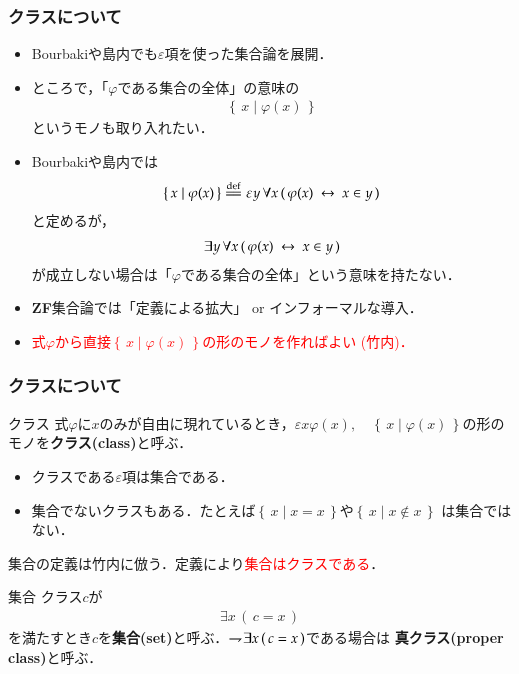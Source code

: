 \documentclass[dvipdfmx,10pt,notheorems]{beamer}
\theoremstyle{definition}
\newcommand{\Set}[2]{\left\{\, #1 \mid #2\, \right\}} %
\newcommand{\defeq}{\overset{\mathrm{def}}{=\joinrel=}} %
\newcommand{\negation}{\rightharpoondown\hspace{-0.25em}} %
\newcommand{\lrarrow}{\hspace{0.25em}\leftrightarrow\hspace{0.25em}} %
\begin{document}
\begin{frame}\frametitle{クラスについて}
	\begin{itemize}
		\item Bourbaki\cite{Bourbaki}や島内\cite{Shimauchi}でも$\varepsilon$項を使った集合論を展開．
		
		\item ところで，「$\varphi$である集合の全体」の意味の
			\begin{align}
				\Set{x}{\varphi(x)}
			\end{align}
			というモノも取り入れたい．
		
		\item Bourbaki\cite{Bourbaki}や島内\cite{Shimauchi}では
			\begin{align}
				\Set{x}{\varphi(x)} \defeq \varepsilon y\, \forall x\, 
				(\, \varphi(x) \lrarrow x \in y\, )
			\end{align}
			と定めるが，
			\begin{align}
				\exists y\, \forall x\, (\, \varphi(x) \lrarrow x \in y\, )
			\end{align}
			が成立しない場合は「$\varphi$である集合の全体」という意味を持たない．
		
		\item {\bf ZF}集合論では「定義による拡大」 or インフォーマルな導入．
			
		\item \textcolor{red}{式$\varphi$から直接$\Set{x}{\varphi(x)}$の形のモノを作ればよい
			(竹内\cite{TakeuchiSet})．}
	\end{itemize}
\end{frame}

\begin{frame}\frametitle{クラスについて}
	\begin{exampleblock}{クラス}
		式$\varphi$に$x$のみが自由に現れているとき，$\varepsilon x \varphi(x),
		\quad \Set{x}{\varphi(x)}$の形のモノを{\bf クラス(class)}と呼ぶ．
	\end{exampleblock}
	
	\begin{itemize}
		\item クラスである$\varepsilon$項は集合である．
		\item 集合でないクラスもある．たとえば$\Set{x}{x = x}$や$\Set{x}{x \notin x}$
			は集合ではない．
	\end{itemize}
	
	集合の定義は竹内\cite{TakeuchiSet}に倣う．定義により\textcolor{red}{集合はクラスである}．
	\begin{exampleblock}{集合}
		クラス$c$が
		\begin{align}
			\exists x\, (\, c = x\, )
		\end{align}
		を満たすとき$c$を{\bf 集合(set)}と呼ぶ．$\negation \exists x\, (\, c = x\, )$である場合は
		{\bf 真クラス(proper class)}と呼ぶ．
	\end{exampleblock}
\end{frame}
\end{document}
